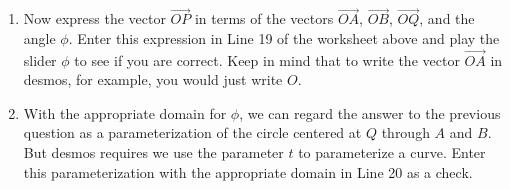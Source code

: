 \documentclass{ximera}
\begin{document}
\begin{question}
\begin{enumerate}
\begin{enumerate}
\end{enumerate}

\item{Now express the vector $\overrightarrow{OP}$ in terms of the vectors $\overrightarrow{OA}$, $\overrightarrow{OB}$, $\overrightarrow{OQ}$, and the angle $\phi$. Enter this expression in Line 19 of the worksheet above and play the slider $\phi$ to see if you are correct. Keep in mind that to write the vector $\overrightarrow{OA}$ in desmos, for example, you would just write $O$.
}

\item{With the appropriate domain for $\phi$, we can regard the answer to the previous question as a parameterization of the circle centered at $Q$ through $A$ and $B$. But desmos requires we use the parameter $t$ to parameterize a curve. Enter this parameterization with the appropriate domain in Line 20 as a check.}

\end{enumerate} 

\end{question}
\end{document}
